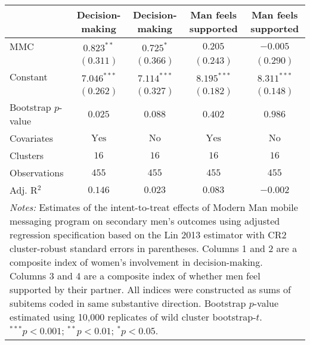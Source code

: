 
\begin{tabular}{l c c c c}
\toprule
 & Decision-making & Decision-making & Man feels supported & Man feels supported \\
\midrule
MMC                 & $0.823^{**}$   & $0.725^{*}$   & $0.205$        & $-0.005$      \\
                    & $(0.311)$      & $(0.366)$     & $(0.243)$      & $(0.290)$     \\
Constant            & $7.046^{***}$  & $7.114^{***}$ & $8.195^{***}$  & $8.311^{***}$ \\
                    & $(0.262)$      & $(0.327)$     & $(0.182)$      & $(0.148)$     \\
\midrule
Bootstrap $p$-value & $0.025$        & $0.088$       & $0.402$        & $0.986$       \\
Covariates          & $\textrm{Yes}$ & $\textrm{No}$ & $\textrm{Yes}$ & $\textrm{No}$ \\
Clusters            & $16$           & $16$          & $16$           & $16$          \\
Observations        & $455$          & $455$         & $455$          & $455$         \\
Adj. R$^2$          & $0.146$        & $0.023$       & $0.083$        & $-0.002$      \\
\bottomrule
\multicolumn{5}{l}{\scriptsize{\parbox{\linewidth}{\vspace{2pt}
       \textit{Notes:} Estimates of the intent-to-treat effects of Modern Man mobile
       messaging program on secondary men's outcomes using adjusted regression
       specification based on the Lin 2013 estimator with CR2 cluster-robust
       standard errors in parentheses. Columns 1 and 2 are a composite index of
       women's involvement in decision-making. Columns 3 and 4 are a composite index of 
       whether men feel supported by their partner. All indices were constructed as sums of 
       subitems coded in same substantive direction. Bootstrap $p$-value estimated using 10,000
       replicates of wild cluster bootstrap-$t$. \\ $^{***}p<0.001$; $^{**}p<0.01$; $^{*}p<0.05$.}}}
\end{tabular}
